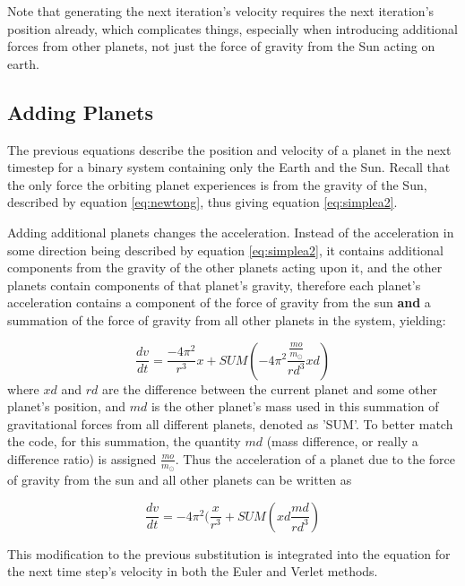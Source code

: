 \documentclass[12pt]{article} %
\begin{document}
Note that generating the next iteration's velocity requires the next iteration's position already, which complicates things, especially when introducing additional forces from other planets, not just the force of gravity from the Sun acting on earth.

\subsection{Adding Planets}
The previous equations describe the position and velocity of a planet in the next timestep for a binary system containing only the Earth and the Sun. Recall that the only force the orbiting planet experiences is from the gravity of the Sun, described by equation \eqref{eq:newtong}, thus giving equation \eqref{eq:simplea2}.

Adding additional planets changes the acceleration. Instead of the acceleration in some direction being described by equation \eqref{eq:simplea2}, it contains additional components from the gravity of the other planets acting upon it, and the other planets contain components of that planet's gravity, therefore each planet's acceleration contains a component of the force of gravity from the sun \textbf{and} a summation of the force of gravity from all other planets in the system, yielding:


\begin{equation}
	\frac{dv}{dt} = \frac{-4\pi^2}{r^3}x + SUM(-4\pi^2\frac{\frac{mo}{m_{\odot}}}{rd^3}xd)
	\label{eq:moara}
\end{equation}
where $xd$ and $rd$ are the difference between the current planet and some other planet's position, and $md$ is the other planet's mass used in this summation of gravitational forces from all different planets, denoted as 'SUM'.
To better match the code, for this summation, the quantity $md$ (mass difference, or really a difference ratio) is assigned $\frac{mo}{m_{\odot}}$. Thus the acceleration of a planet due to the force of gravity from the sun and all other planets can be written as

\begin{equation}
	\frac{dv}{dt} = -4\pi^2(\frac{x}{r^3} + SUM(xd\frac{md}{rd^3})
	\label{eq:moara2}
\end{equation}

This modification to the previous substitution is integrated into the equation for the next time step's velocity in both the Euler and Verlet methods.
\end{document}
